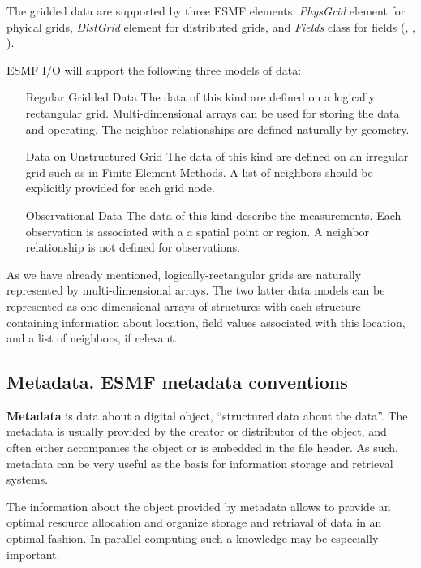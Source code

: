 The gridded data are supported by three ESMF elements: {\em PhysGrid} element 
for phyical grids, {\em DistGrid} element for distributed grids, and 
{\em Fields} class for fields (\cite{ESMF-PhysGrid-Req},
\cite{ESMF-DistGrid-Req}, \cite{ESMF-Field-Req}). 

ESMF I/O will support the following three models of data: 

\begin{itemize}
\item[Regular Gridded Data] The data of this kind are defined on a logically 
rectangular grid. Multi-dimensional arrays can be used for storing the data 
and operating. The neighbor relationships are defined naturally by geometry.

\item[Data on Unstructured Grid] The data of this kind are defined on an 
irregular grid such as in Finite-Element Methods. A list of neighbors should 
be explicitly provided for each grid node. 

\item[Observational Data] The data of this kind describe the 
measurements. Each observation is associated with a a spatial point or region.
A neighbor relationship is not defined for observations. 
\end{itemize}
As we have already mentioned, logically-rectangular grids are naturally 
represented by multi-dimensional arrays. The two latter data models can be 
represented as one-dimensional arrays of structures with each structure 
containing information about location, field values associated with this 
location, and a list of neighbors, if relevant. 

\subsection{Metadata. ESMF metadata conventions}

{\bf Metadata} is data about a digital object, ``structured data about the 
data''. The metadata is usually provided by the creator or distributor of 
the object, and often either accompanies the object or is embedded in the 
file header. As such, metadata can be very useful as the basis for 
information storage and retrieval systems.

The information about the object provided by metadata allows to provide an 
optimal resource allocation and organize storage and retriaval of data in an 
optimal fashion. In parallel computing such a knowledge may be especially 
important. 

